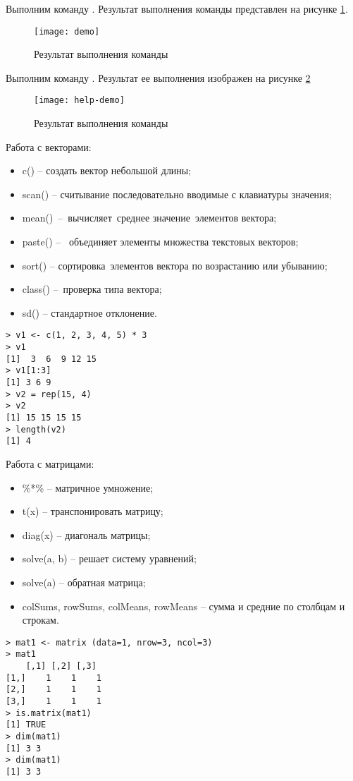 \documentclass[a4paper,14pt]{extarticle}
\begin{document}
Выполним команду . Результат выполнения команды представлен
на рисунке \ref{fig:demo}.
\begin{figure}[H]
    \centering
    \texttt{[image: demo]}
    \caption{Результат выполнения команды }
    \label{fig:demo}
\end{figure}

Выполним команду . Результат ее выполнения изображен на рисунке \ref{fig:help-demo}
\begin{figure}[H]
    \centering
    \texttt{[image: help-demo]}
    \caption{Результат выполнения команды }
    \label{fig:help-demo}
\end{figure}

Работа с векторами:
\begin{itemize}
    \item c() – создать вектор небольшой длины;
    \item scan() – считывание последовательно вводимые с клавиатуры значения;
    \item mean() – вычисляет среднее значение элементов вектора;
    \item paste() –  объединяет элементы множества текстовых векторов;
    \item sort() – сортировка элементов вектора по возрастанию или убыванию;
    \item class() – проверка типа вектора;
    \item sd() – стандартное отклонение.
\end{itemize}
\begin{lstlisting}
> v1 <- c(1, 2, 3, 4, 5) * 3
> v1
[1]  3  6  9 12 15
> v1[1:3]
[1] 3 6 9
> v2 = rep(15, 4)
> v2
[1] 15 15 15 15
> length(v2)
[1] 4
\end{lstlisting}

Работа с матрицами:
\begin{itemize}
    \item \%*\% – матричное умножение;
    \item t(x) – транспонировать матрицу;
    \item diag(x) – диагональ матрицы;
    \item solve(a, b) – решает систему уравнений;
    \item solve(a) – обратная матрица;
    \item colSums, rowSums, colMeans, rowMeans – сумма и средние по столбцам и строкам.
\end{itemize}
\begin{lstlisting}
> mat1 <- matrix (data=1, nrow=3, ncol=3)
> mat1
    [,1] [,2] [,3]
[1,]    1    1    1
[2,]    1    1    1
[3,]    1    1    1
> is.matrix(mat1)
[1] TRUE
> dim(mat1)
[1] 3 3
> dim(mat1)
[1] 3 3
\end{lstlisting}
\end{document}
